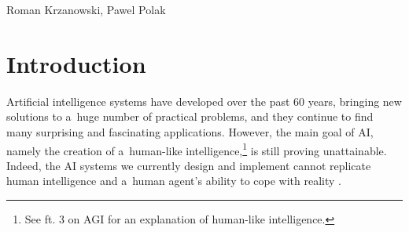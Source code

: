 \begin{artengenv2auth}{Roman Krzanowski, Pawel Polak}
%
%
%
%

\section*{Introduction}
\lettrine[loversize=0.13,lines=2,lraise=-0.07,nindent=5pt,findent=-5pt]%
{A}{}rtificial intelligence systems have developed over the past 60 years, bringing new solutions to a~huge number of practical problems, and they continue to find many surprising and fascinating applications. However, the main goal of AI, namely the creation of a~human-like intelligence,\footnote{See ft. 3 on AGI for an explanation of human-like intelligence.} is still proving unattainable. Indeed, the
AI systems we currently design and implement cannot replicate human intelligence and a~human agent's ability to cope with reality
\parencites[see, e.g.,][]{brooks_intelligence_1991}[][]{minsky_logical_1991}[][]{dreyfus_skillful_2016}[][]{mitchell_artificial_2019}[][]{boltuc_conscious_2020}[][]{roitblat_algorithms_2020}[][]{wooldridge_road_2021}.%



\end{artengenv2auth}
